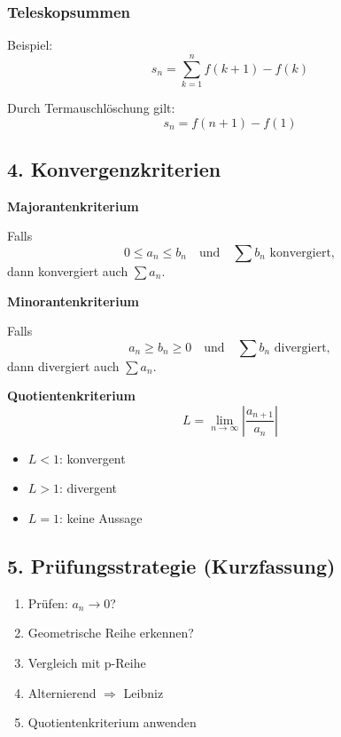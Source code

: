 \documentclass[../zusammenfassung_AN.tex]{subfiles}
\begin{document}
	\subsubsection{Teleskopsummen}
	Beispiel: 
	$$s_n=\sum_{k=1}^{n}f(k+1)-f(k)$$
	
	Durch Termauschlöschung gilt:
	$$s_n=f(n+1)-f(1)$$
	
	\subsection*{4. Konvergenzkriterien}
	
	\textbf{Majorantenkriterium}
	
	Falls
	\[
	0 \le a_n \le b_n \quad \text{und} \quad \sum b_n \text{ konvergiert},
	\]
	dann konvergiert auch $\sum a_n$.
	
	\textbf{Minorantenkriterium}
	
	Falls
	\[
	a_n \ge b_n \ge 0 \quad \text{und} \quad \sum b_n \text{ divergiert},
	\]
	dann divergiert auch $\sum a_n$.
	
	\textbf{Quotientenkriterium}
	\[
	L = \lim_{n\to\infty} \left|\frac{a_{n+1}}{a_n}\right|
	\]
	
	\begin{itemize}
		\item $L<1$: konvergent
		\item $L>1$: divergent
		\item $L=1$: keine Aussage
	\end{itemize}
	
	\subsection*{5. Prüfungsstrategie (Kurzfassung)}
	
	\begin{enumerate}
		\item Prüfen: $a_n \to 0$?
		\item Geometrische Reihe erkennen?
		\item Vergleich mit p-Reihe
		\item Alternierend $\Rightarrow$ Leibniz
		\item Quotientenkriterium anwenden
	\end{enumerate}
	
	
\end{document}
